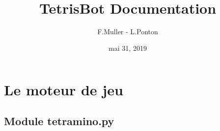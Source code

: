 \documentclass[letterpaper,10pt,french]{sphinxmanual}
\title{TetrisBot Documentation}
\date{mai 31, 2019}
\author{F.Muller - L.Ponton}
\begin{document}
\maketitle
\sphinxtableofcontents
{}\label{\detokenize{index::doc}}



\chapter{Le moteur de jeu}
\label{\detokenize{index:welcome-to-tetrisbot-s-documentation}}\label{\detokenize{index:le-moteur-de-jeu}}

\section{Module tetramino.py}
\label{\detokenize{index:module-tetramino}}\label{\detokenize{index:module-tetramino-py}}
\end{document}
